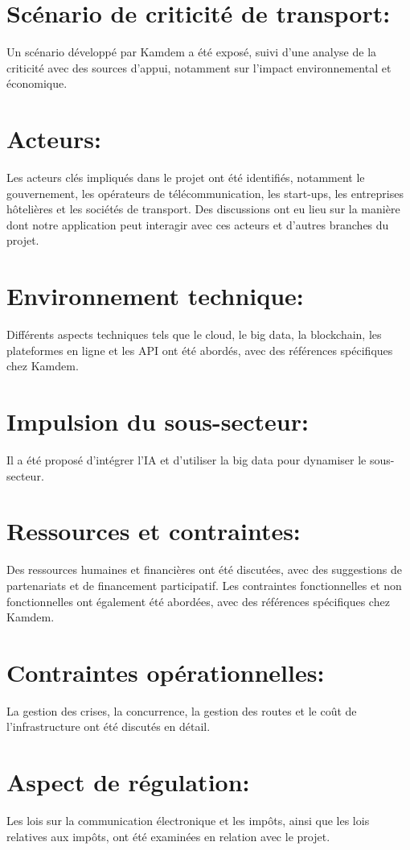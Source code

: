 \documentclass{article}
\begin{document}
\section{Scénario de criticité de transport:}
Un scénario développé par Kamdem a été exposé, suivi d'une analyse de la criticité avec des sources d'appui, notamment sur l'impact environnemental et économique.

\section{Acteurs:}
Les acteurs clés impliqués dans le projet ont été identifiés, notamment le gouvernement, les opérateurs de télécommunication, les start-ups, les entreprises hôtelières et les sociétés de transport. Des discussions ont eu lieu sur la manière dont notre application peut interagir avec ces acteurs et d'autres branches du projet.

\section{Environnement technique:}
Différents aspects techniques tels que le cloud, le big data, la blockchain, les plateformes en ligne et les API ont été abordés, avec des références spécifiques chez Kamdem.

\section{Impulsion du sous-secteur:}
Il a été proposé d'intégrer l'IA et d'utiliser la big data pour dynamiser le sous-secteur.

\section{Ressources et contraintes:}
Des ressources humaines et financières ont été discutées, avec des suggestions de partenariats et de financement participatif. Les contraintes fonctionnelles et non fonctionnelles ont également été abordées, avec des références spécifiques chez Kamdem.

\section{Contraintes opérationnelles:}
La gestion des crises, la concurrence, la gestion des routes et le coût de l'infrastructure ont été discutés en détail.

\section{Aspect de régulation:}
Les lois sur la communication électronique et les impôts, ainsi que les lois relatives aux impôts, ont été examinées en relation avec le projet.
\end{document}
